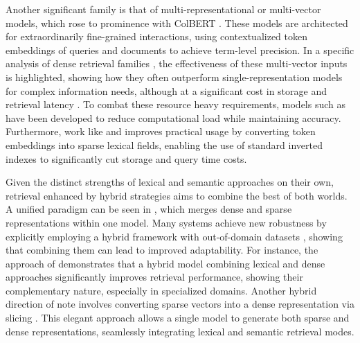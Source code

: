 \documentclass[11pt]{article}
\begin{document}
Another significant family is that of multi-representational or multi-vector models, which rose to prominence with ColBERT \cite{ref83}. These models are architected for extraordinarily fine-grained interactions, using contextualized token embeddings of queries and documents to achieve term-level precision. In a specific analysis of dense retrieval families \cite{ref84}, the effectiveness of these multi-vector inputs is highlighted, showing how they often outperform single-representation models for complex information needs, although at a significant cost in storage and retrieval latency \cite{ref85}. To combat these resource heavy requirements, models such as \cite{ref86} have been developed to reduce computational load while maintaining accuracy. Furthermore, work like \cite{ref87} and \cite{ref88} improves practical usage by converting token embeddings into sparse lexical fields, enabling the use of standard inverted indexes to significantly cut storage and query time costs.

Given the distinct strengths of lexical and semantic approaches on their own, retrieval enhanced by hybrid strategies aims to combine the best of both worlds. A unified paradigm can be seen in \cite{ref89}, which merges dense and sparse representations within one model. Many systems achieve new robustness by explicitly employing a hybrid framework with out-of-domain datasets \cite{ref90}, showing that combining them can lead to improved adaptability. For instance, the approach of \cite{ref91} demonstrates that a hybrid model combining lexical and dense approaches significantly improves retrieval performance, showing their complementary nature, especially in specialized domains. Another hybrid direction of note involves converting sparse vectors into a dense representation via slicing \cite{ref92}. This elegant approach allows a single model to generate both sparse and dense representations, seamlessly integrating lexical and semantic retrieval modes.
\end{document}

